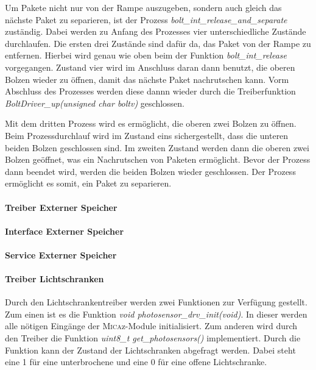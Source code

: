 Um Pakete nicht nur von der Rampe auszugeben, sondern auch gleich das nächste Paket zu separieren, ist der Prozess \textit{bolt\_int\_release\_and\_separate} zuständig. Dabei werden zu Anfang des Prozesses vier unterschiedliche Zustände durchlaufen. Die ersten drei Zustände sind dafür da, das Paket von der Rampe zu entfernen. Hierbei wird genau wie oben beim der Funktion \textit{bolt\_int\_release} vorgegangen. Zustand vier wird im Anschluss daran dann benutzt, die oberen Bolzen wieder zu öffnen, damit das nächste Paket nachrutschen kann. Vorm Abschluss des Prozesses werden diese dannn wieder durch die Treiberfunktion \textit{BoltDriver\_up(unsigned char boltv)} geschlossen.

Mit dem dritten Prozess wird es ermöglicht, die oberen zwei Bolzen zu öffnen. Beim Prozessdurchlauf wird im Zustand eins sichergestellt, dass die unteren beiden Bolzen geschlossen sind. Im zweiten Zustand werden dann die oberen zwei Bolzen geöffnet, was ein Nachrutschen von Paketen ermöglicht. Bevor der Prozess dann beendet wird, werden die beiden Bolzen wieder geschlossen. Der Prozess ermöglicht es somit, ein Paket zu separieren.

\paragraph{Treiber Externer Speicher}

\paragraph{Interface Externer Speicher}

\paragraph{Service Externer Speicher}

\paragraph{Treiber Lichtschranken}
Durch den Lichtschrankentreiber werden zwei Funktionen zur Verfügung gestellt. Zum einen ist es die Funktion \textit{void photosensor\_drv\_init(void)}. In dieser werden alle nötigen Eingänge der \textsc{Mica}z-Module initialisiert. Zum anderen wird durch den Treiber die Funktion \textit{uint8\_t get\_photosensors()} implementiert. Durch die Funktion kann der Zustand der Lichtschranken abgefragt werden. Dabei steht eine 1 für eine unterbrochene und eine 0 für eine offene Lichtschranke.

